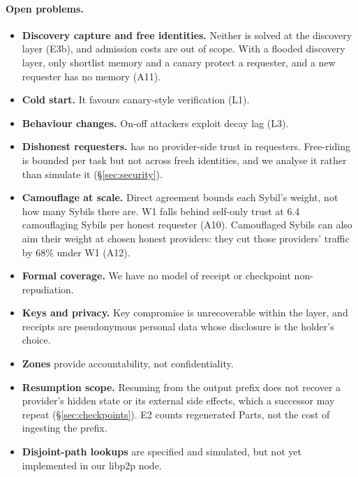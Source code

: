 \paragraph{Open problems.}
\begin{itemize}
\item \textbf{Discovery capture and free identities.} Neither is solved
  at the discovery layer (E3b), and admission costs are out of scope.
  With a flooded discovery layer, only shortlist memory and a canary
  protect a requester, and a new requester has no memory (A11).
\item \textbf{Cold start.} It favours canary-style verification (L1).
\item \textbf{Behaviour changes.} On-off attackers exploit decay lag (L3).
\item \textbf{Dishonest requesters.} \sys{} has no provider-side trust
  in requesters. Free-riding is bounded per task but not across fresh
  identities, and we analyse it rather than simulate it
  (\S\ref{sec:security}).
\item \textbf{Camouflage at scale.} Direct agreement bounds each Sybil's
  weight, not how many Sybils there are. W1 falls behind self-only trust
  at 6.4 camouflaging Sybils per honest requester (A10). Camouflaged
  Sybils can also aim their weight at chosen honest providers: they cut
  those providers' traffic by 68\% under W1 (A12).
\item \textbf{Formal coverage.} We have no model of receipt or checkpoint
  non-repudiation.
\item \textbf{Keys and privacy.} Key compromise is unrecoverable within
  the layer, and receipts are pseudonymous personal data whose disclosure
  is the holder's choice.
\item \textbf{Zones} provide accountability, not confidentiality.
\item \textbf{Resumption scope.} Resuming from the output prefix does not
  recover a provider's hidden state or its external side effects, which
  a successor may repeat (\S\ref{sec:checkpoints}). E2 counts
  regenerated Parts, not the cost of ingesting the prefix.
\item \textbf{Disjoint-path lookups} are specified and simulated, but not
  yet implemented in our libp2p node.
\end{itemize}
